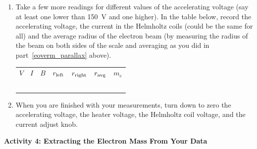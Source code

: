 \begin{enumerate}[labparts]
\item Take a few more readings for different values of the accelerating voltage (say at least one lower than 150~V
 and one higher).  In the table below, record the accelerating voltage, the current in the 
Helmholtz coils (could be the same for all) 
and the average radius of the electron beam (by measuring the radius of the 
beam on both sides of the scale and averaging as you did in part~\ref{eoverm_parallax} above). 

\begin{center}
{\renewcommand{\arraystretch}{1.8}
\begin{tabular}{|*{7}{ C{0.75in} |}}
\hline
$V$ & $I$ & $B$ & $r_{\rm left}$ & $r_{\rm right}$ & $r_{\rm avg}$ & $m_e$  \\ 
\hhline{|=|=|=|=|=|=|=|}
& & & & & & \\ \hline
& & & & & & \\ \hline
& & & & & & \\ \hline
& & & & & & \\ \hline
& & & & & & \\ \hline
\end{tabular}
}
\end{center}

\item When you are finished with your measurements, turn down to zero the accelerating voltage, the 
heater voltage, the Helmholtz coil voltage, and the current adjust knob.

\end{enumerate}

\pagebreak[2]
\textbf{Activity 4: Extracting the Electron Mass From Your Data}

